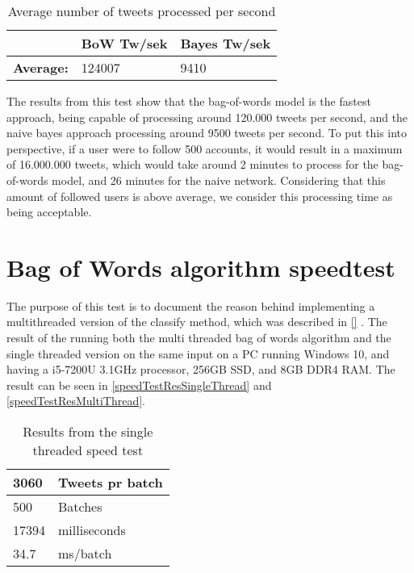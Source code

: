 \begin{table}[H]\centering
\begin{tabular}{|l|l|l|}\hline
					&	\textbf{BoW Tw/sek}	&	\textbf{Bayes Tw/sek}	\\\hline
\textbf{Average:}	&	124007				&	9410 					\\\hline	
\end{tabular}
\caption{Average number of tweets processed per second}
\label{AvgTweetsPs}
\end{table}

The results from this test show that the bag-of-words model is the fastest
approach, being capable of processing around 120.000 tweets per second, and the
naive bayes approach processing around 9500 tweets per second. To put this into
perspective, if a user were to follow 500 accounts, it would result in a maximum
of 16.000.000 tweets, which would take around 2 minutes to process for the
bag-of-words model, and 26 minutes for the naive network. Considering that this
amount of followed users is above average, we consider this processing time as
being acceptable.

\section{Bag of Words algorithm speedtest}
The purpose of this test is to document the reason behind implementing a
multithreaded version of the classify method, which was described in \autoref{}
. 
The result of the running both the multi threaded bag of words algorithm and the
single threaded version on the same input on a PC running Windows 10, and having
a i5-7200U 3.1GHz processor, 256GB SSD, and 8GB DDR4 RAM.
The result can be seen in \autoref{speedTestResSingleThread} and
\autoref{speedTestResMultiThread}.

\begin{table}[H]\centering
\begin{tabular}{|l|l|}
\hline
3060	&	Tweets pr batch 	\\\hline
500		&	Batches				\\\hline
17394	&	milliseconds		\\\hline
34.7	&	ms/batch 			\\\hline
\end{tabular}
\caption{Results from the single threaded speed test}
\label{speedTestResSingleThread}
\end{table}

